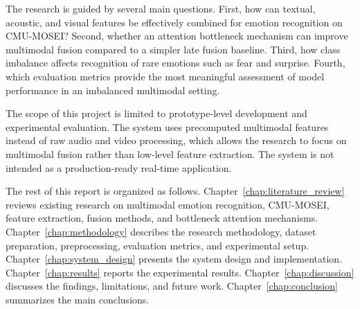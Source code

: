The research is guided by several main questions. First, how can textual, acoustic, and visual features be effectively combined for emotion recognition on CMU-MOSEI? Second, whether an attention bottleneck mechanism can improve multimodal fusion compared to a simpler late fusion baseline. Third, how class imbalance affects recognition of rare emotions such as fear and surprise. Fourth, which evaluation metrics provide the most meaningful assessment of model performance in an imbalanced multimodal setting.

The scope of this project is limited to prototype-level development and experimental evaluation. The system uses precomputed multimodal features instead of raw audio and video processing, which allows the research to focus on multimodal fusion rather than low-level feature extraction. The system is not intended as a production-ready real-time application.

The rest of this report is organized as follows. Chapter~\ref{chap:literature_review} reviews existing research on multimodal emotion recognition, CMU-MOSEI, feature extraction, fusion methods, and bottleneck attention mechanisms. Chapter~\ref{chap:methodology} describes the research methodology, dataset preparation, preprocessing, evaluation metrics, and experimental setup. Chapter~\ref{chap:system_design} presents the system design and implementation. Chapter~\ref{chap:results} reports the experimental results. Chapter~\ref{chap:discussion} discusses the findings, limitations, and future work. Chapter~\ref{chap:conclusion} summarizes the main conclusions.